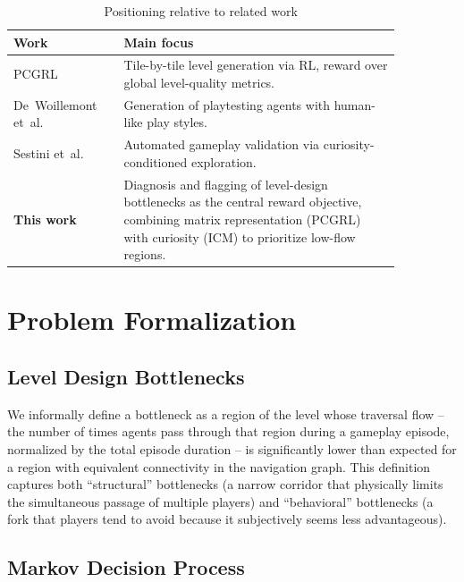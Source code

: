 \documentclass[sigconf,nonacm,language=english]{acmart}
\begin{document}
\begin{table}
  \caption{Positioning relative to related work}
  \label{tab:relacionados}
  \begin{tabular}{p{0.24\linewidth}p{0.62\linewidth}}
    \toprule
    \textbf{Work} & \textbf{Main focus} \\
    \midrule
    PCGRL~\cite{khalifa2020pcgrl} & Tile-by-tile level generation via RL,
      reward over global level-quality metrics. \\
    De~Woillemont et~al.~\cite{dewoillemont2022automated} & Generation of
      playtesting agents with human-like play styles. \\
    Sestini et~al.~\cite{sestini2022automated} & Automated gameplay
      validation via curiosity-conditioned exploration. \\
    \textbf{This work} & Diagnosis and flagging of level-design bottlenecks
      as the central reward objective, combining matrix representation
      (PCGRL) with curiosity (ICM) to prioritize low-flow regions. \\
    \bottomrule
  \end{tabular}
\end{table}

\section{Problem Formalization}
\label{sec:formalizacao}

\subsection{Level Design Bottlenecks}

We informally define a bottleneck as a region of the level whose traversal
flow -- the number of times agents pass through that region during a
gameplay episode, normalized by the total episode duration -- is
significantly lower than expected for a region with equivalent
connectivity in the navigation graph. This definition captures both
``structural'' bottlenecks (a narrow corridor that physically limits the
simultaneous passage of multiple players) and ``behavioral'' bottlenecks (a
fork that players tend to avoid because it subjectively seems less
advantageous).

\subsection{Markov Decision Process}
\end{document}

